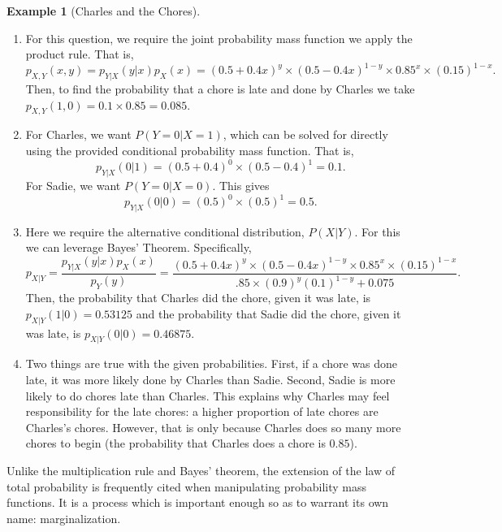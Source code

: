 \documentclass[
  letterpaper,
  DIV=11,
  numbers=noendperiod]{scrreprt}
\theoremstyle{definition}
\theoremstyle{definition}
\theoremstyle{definition}
\newtheorem{example}{Example}[chapter]
\theoremstyle{remark}
\begin{document}
\begin{example}[Charles and the
Chores]
\begin{tcolorbox}[enhanced jigsaw, colback=white, breakable, rightrule=.15mm, leftrule=.75mm, toprule=.15mm, left=2mm, arc=.35mm, opacityback=0, bottomrule=.15mm]
\begin{enumerate}
\def\labelenumi{\alph{enumi}.}
\item
  For this question, we require the joint probability mass function we
  apply the product rule. That is,
  \[p_{X,Y}(x,y) = p_{Y|X}(y|x)p_{X}(x) = (0.5 + 0.4x)^{y}\times(0.5 - 0.4x)^{1-y}\times0.85^{x}\times(0.15)^{1-x}.\]
  Then, to find the probability that a chore is late and done by Charles
  we take \(p_{X,Y}(1,0) = 0.1\times 0.85 = 0.085.\)
\item
  For Charles, we want \(P(Y=0|X=1)\), which can be solved for directly
  using the provided conditional probability mass function. That is,
  \[p_{Y|X}(0|1) = (0.5 + 0.4)^{0}\times(0.5 - 0.4)^{1} = 0.1.\] For
  Sadie, we want \(P(Y=0|X=0)\). This gives
  \[p_{Y|X}(0|0) = (0.5)^{0}\times(0.5)^{1} = 0.5.\]
\item
  Here we require the alternative conditional distribution, \(P(X|Y)\).
  For this we can leverage Bayes' Theorem. Specifically,
  \[p_{X|Y} = \frac{p_{Y|X}(y|x)p_{X}(x)}{p_{Y}(y)} = \frac{(0.5 + 0.4x)^{y}\times(0.5 - 0.4x)^{1-y}\times0.85^{x}\times(0.15)^{1-x}}{.85\times(0.9)^y(0.1)^{1-y} + 0.075}.\]
  Then, the probability that Charles did the chore, given it was late,
  is \(p_{X|Y}(1|0) = 0.53125\) and the probability that Sadie did the
  chore, given it was late, is \(p_{X|Y}(0|0) = 0.46875\).
\item
  Two things are true with the given probabilities. First, if a chore
  was done late, it was more likely done by Charles than Sadie. Second,
  Sadie is more likely to do chores late than Charles. This explains why
  Charles may feel responsibility for the late chores: a higher
  proportion of late chores are Charles's chores. However, that is only
  because Charles does so many more chores to begin (the probability
  that Charles does a chore is \(0.85\)).\footnotemark{}
\end{enumerate}

\end{tcolorbox}


\end{example}

Unlike the multiplication rule and Bayes' theorem, the extension of the
law of total probability is frequently cited when manipulating
probability mass functions. It is a process which is important enough so
as to warrant its own name: marginalization.
\end{document}
